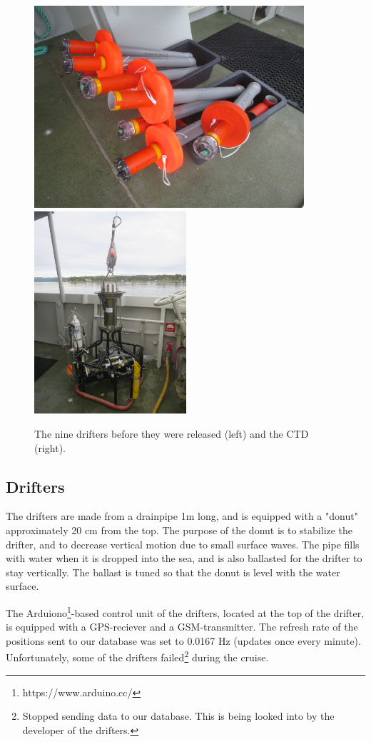 \documentclass[12pt,a4paper,english]{article}
\begin{document}
\begin{figure}[tb]
\centerline{
\includegraphics*[height=7.5cm]{Figurer/Driftere_ombord}
\includegraphics*[height=7.5cm]{Figurer/CTD}
}
\caption{\small
The nine drifters before they were released (left) and the CTD (right).}
\label{fig:Utstyr}
\end{figure}

\subsection{Drifters}
The drifters are made from a drainpipe 1m long, and is equipped with a "donut" approximately 20 cm from the top. The purpose of the donut is to stabilize the drifter, and to decrease vertical motion due to small surface waves. The pipe fills with water when it is dropped into the sea, and is also ballasted for the drifter to stay vertically. The ballast is tuned so that the donut is level with the water surface.

The Arduiono\footnote{https://www.arduino.cc/}-based control unit of the drifters, located at the top of the drifter, is equipped with a GPS-reciever and a GSM-transmitter. The refresh rate of the positions sent to our database was set to 0.0167 Hz (updates once every minute). Unfortunately, some of the drifters failed\footnote{Stopped sending data to our database. This is being looked into by the developer of the drifters.} during the cruise.
\end{document}
